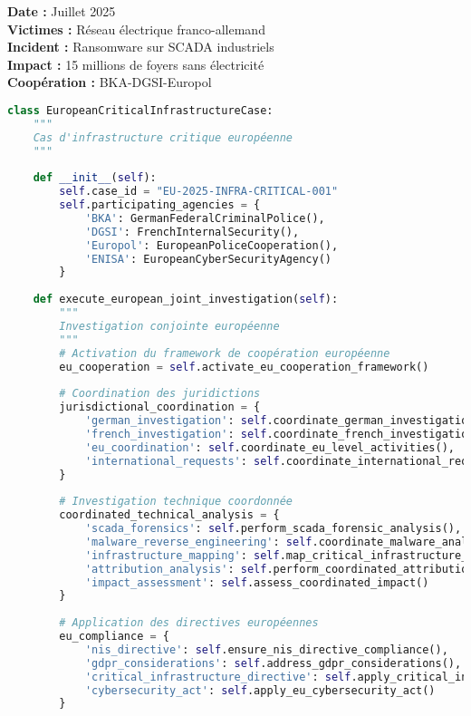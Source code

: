 \textbf{Date :} Juillet 2025 \\
\textbf{Victimes :} Réseau électrique franco-allemand \\
\textbf{Incident :} Ransomware sur SCADA industriels \\
\textbf{Impact :} 15 millions de foyers sans électricité \\
\textbf{Coopération :} BKA-DGSI-Europol

\begin{lstlisting}[language=Python, caption=Investigation transfrontalière européenne]
class EuropeanCriticalInfrastructureCase:
    """
    Cas d'infrastructure critique européenne
    """
    
    def __init__(self):
        self.case_id = "EU-2025-INFRA-CRITICAL-001" 
        self.participating_agencies = {
            'BKA': GermanFederalCriminalPolice(),
            'DGSI': FrenchInternalSecurity(),
            'Europol': EuropeanPoliceCooperation(),
            'ENISA': EuropeanCyberSecurityAgency()
        }
        
    def execute_european_joint_investigation(self):
        """
        Investigation conjointe européenne
        """
        # Activation du framework de coopération européenne
        eu_cooperation = self.activate_eu_cooperation_framework()
        
        # Coordination des juridictions
        jurisdictional_coordination = {
            'german_investigation': self.coordinate_german_investigation_track(),
            'french_investigation': self.coordinate_french_investigation_track(),
            'eu_coordination': self.coordinate_eu_level_activities(),
            'international_requests': self.coordinate_international_requests()
        }
        
        # Investigation technique coordonnée
        coordinated_technical_analysis = {
            'scada_forensics': self.perform_scada_forensic_analysis(),
            'malware_reverse_engineering': self.coordinate_malware_analysis(),
            'infrastructure_mapping': self.map_critical_infrastructure_topology(),
            'attribution_analysis': self.perform_coordinated_attribution_analysis(),
            'impact_assessment': self.assess_coordinated_impact()
        }
        
        # Application des directives européennes
        eu_compliance = {
            'nis_directive': self.ensure_nis_directive_compliance(),
            'gdpr_considerations': self.address_gdpr_considerations(),
            'critical_infrastructure_directive': self.apply_critical_infra_directive(),
            'cybersecurity_act': self.apply_eu_cybersecurity_act()
        }
        

\end{lstlisting}
